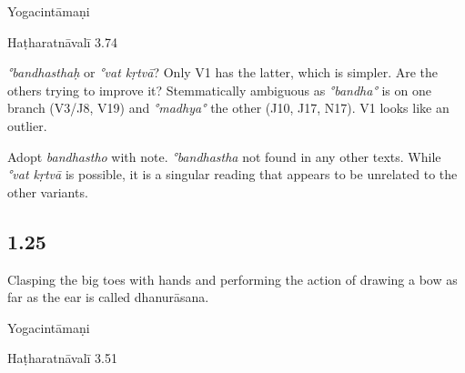 \begin{ekdosis}
\begin{testimonia}[hp01_024]
Yogacintāmaṇi

\begin{versinnote}
\end{versinnote}

Haṭharatnāvalī 3.74

\begin{versinnote}
\end{versinnote}

\end{testimonia}

\begin{philcomm}[hp01_024]
\emph{°bandhasthaḥ} or \emph{°vat kṛtvā}? Only V1 has the latter, which is simpler. Are the others trying to improve it? Stemmatically ambiguous as \emph{°bandha°} is on one branch (V3/J8, V19) and \emph{°madhya°} the other (J10, J17, N17). V1 looks like an outlier.

Adopt \emph{bandhastho} with note. \emph{°bandhastha} not found in any other texts. While \emph{°vat kṛtvā} is possible, it is a singular reading that appears to be unrelated to the other variants.
\end{philcomm}

\subsection*{1.25}
\begin{translation}[hp01_025]
Clasping the big toes with hands and performing the action of drawing a bow as far as the ear is called dhanurāsana.
\end{translation}

\begin{testimonia}[hp01_025]
Yogacintāmaṇi

\begin{versinnote}
\end{versinnote}

Haṭharatnāvalī 3.51


\end{testimonia}
\end{ekdosis}

